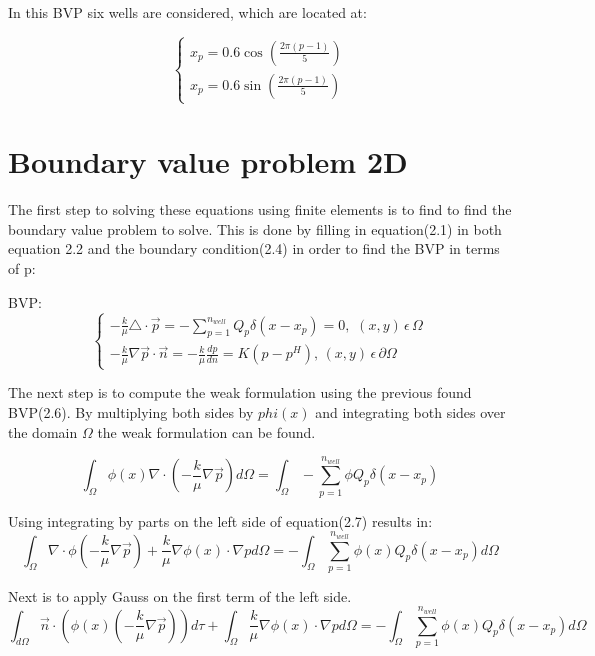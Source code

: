 \documentclass{report}
\begin{document}
In this BVP six wells are considered, which are located at:


\begin{equation}
	\begin{cases} 
		x_p=0.6\cos(\frac{2\pi (p-1)}{5}) \\ x_p=0.6\sin(\frac{2\pi (p-1)}{5})
	\end{cases} 
\end{equation}


\section{Boundary value problem 2D}
The first step to solving these equations using finite elements is to find to find the boundary value problem to solve. This is done by filling in equation(2.1) in both equation 2.2 and the boundary condition(2.4) in order to find the BVP in terms of p:
\vspace{5mm}

BVP:
\begin{equation}
	\begin{cases}
		-\frac{k}{\mu}\triangle\cdot\vec{p}=-\sum_{p=1}^{n_{well}}Q_p\delta(x-x_p)=0,\, \, (x,y) \, \epsilon \, \Omega\\
		-\frac{k}{\mu}\nabla\vec{p}\cdot\vec{n}=-\frac{k}{\mu}\frac{dp}{dn} =K(p-p^H), \, (x,y)\,  \epsilon  \, \partial\Omega
	\end{cases}
\end{equation}

\bigskip

The next step is to compute the weak formulation using the previous found BVP(2.6). By multiplying both sides by $phi(x)$ and integrating both sides over the domain $\Omega$ the weak formulation can be found.

\begin{equation}
	\int_{\Omega}\phi(x)\nabla\cdot( -\frac{k}{\mu}\nabla\vec{p}) d\Omega =\int_{\Omega}-\sum_{p=1}^{n_{well}}\phi  Q_p\delta(x-x_p)
\end{equation}

Using integrating by parts on the left side of equation(2.7) results in:
\begin{equation}
	\int_{\Omega}\nabla\cdot\phi(-\frac{k}{\mu}\nabla\vec{p})+\frac{k}{\mu}\nabla\phi(x)\cdot\nabla p d\Omega= -\int_{\Omega}\sum_{p=1}^{n_{well}}\phi(x) Q_p\delta(x-x_p)d\Omega
\end{equation}

Next is to apply Gauss on the first term of the left side.
\begin{equation}
	\int_{d\Omega}\vec{n}\cdot(\phi(x)(-\frac{k}{\mu}\nabla\vec{p}))d\tau+\int_{\Omega}\frac{k}{\mu}\nabla\phi(x)\cdot\nabla p d\Omega= -\int_{\Omega}\sum_{p=1}^{n_{well}}\phi(x) Q_p\delta(x-x_p)d\Omega
\end{equation}
\end{document}
